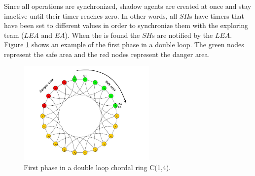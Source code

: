 Since all operations are synchronized, shadow agents are created at once and stay inactive until their timer reaches zero. In other words, all $SH$s have timers that have been set to different values in order to synchronize them with the exploring team ($LEA$ and $EA$). 
When the \bv is found the  $SH$s are notified by the $LEA$. 
Figure \ref{fig:ph1} shows an example of the first phase in a double loop. The green nodes represent the safe area and the red nodes represent the danger area.
\begin{figure}[H] 
  \centering
   
  \includegraphics[width=0.6\textwidth]{figures/dloop_ph1.jpg}
  \caption{First phase in a double loop chordal ring C(1,4).} \label{fig:ph1}
\end{figure}






  \begin{center}
\end{center}





